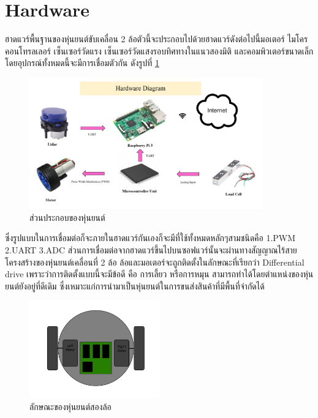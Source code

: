 \documentclass{classes/fiboreport}
\begin{document}
\section{Hardware}
ฮาดแวร์พื้นฐานของหุ่นยนต์ขับเคลื่อน 2 ล้อตัวนี้จะประกอบไปด้วยฮาดแวร์ดังต่อไปนี้มอเตอร์
ไมโครคอนโทรลเลอร์  เซ็นเซอร์วัดแรง เซ็นเซอร์วัดแสงรอบทิศทางในแนวสองมิติ
และคอมพิวเตอร์ขนาดเล็ก โดยอุปกรณ์ทั้งหมดนี้จะมีการเชื่อมตัวกัน ดังรูปที่ \ref{fig:hardware}
\begin{figure}[!ht]
	\centering
	\includegraphics[width=0.9\textwidth]{images/hardware.png}
	\caption{ส่วนประกอบของหุ่นยนต์}
	\label{fig:hardware}
\end{figure}
ซึ่งรูปแบบในการเชื่อมต่อก็จะภายในฮาดแวร์กันเองก็จะมีที่ใช้ทั้งหมดหลักๆสามชนิดคือ 
1.PWM 2.UART 3.ADC
ส่วนการเชื่อมต่อจากฮาดแวร์ขึ้นไปบนซอฟแวร์นั้นจะผ่านทางสัญญาณไร้สาย
โครงสร้างของหุ่นยนต์เคลื่อนที่ 2 ล้อ ล้อและมอเตอร์จะถูกติดตั้งในลักษณะที่เรียกว่า
Differential drive เพราะว่าการติดตั้งแบบนี้จะมีข้อดี คือ การเลี้ยว หรือการหมุน
สามารถทำได้โดยตำแหน่งของหุ่นยนต์ยังอยู่ที่ดีเดิม ซึ่งเหมาะแก่การนำมาเป็นหุ่นยนต์ในการขนส่งสินค้าที่มีพื้นที่จำกัดได้
\begin{figure}[!ht]
	\centering
	\includegraphics[width=0.5\textwidth]{images/robot.png}
	\caption{ลักษณะของหุ่นยนต์สองล้อ}
	\label{fig:robot}
\end{figure}

\clearpage
\end{document}
